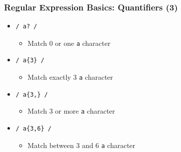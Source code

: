 \documentclass{beamer}
\begin{document}
\begin{frame}[fragile]
    \frametitle{Regular Expression Basics: Quantifiers (3)}
    \begin{itemize}
        \item \begin{verbatim}/ a? /\end{verbatim}
        \begin{itemize}
            \item Match 0 or one \texttt{a} character
        \end{itemize}
        \item \begin{verbatim}/ a{3} /\end{verbatim}
        \begin{itemize}
            \item Match exactly 3 \texttt{a} character
        \end{itemize}
        \item \begin{verbatim}/ a{3,} /\end{verbatim}
        \begin{itemize}
            \item Match 3 or more \texttt{a} character
        \end{itemize}
        \item \begin{verbatim}/ a{3,6} /\end{verbatim}
        \begin{itemize}
            \item Match between 3 and 6 \texttt{a} character
        \end{itemize}
    \end{itemize}
\end{frame}
\end{document}
